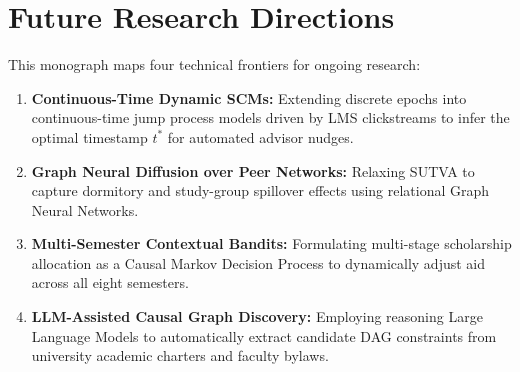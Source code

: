 \section{Future Research Directions}
\label{sec:concl_future}

This monograph maps four technical frontiers for ongoing research:
\begin{enumerate}
    \item \textbf{Continuous-Time Dynamic SCMs:} Extending discrete epochs into continuous-time jump process models driven by LMS clickstreams to infer the optimal timestamp $t^*$ for automated advisor nudges.
    \item \textbf{Graph Neural Diffusion over Peer Networks:} Relaxing SUTVA to capture dormitory and study-group spillover effects using relational Graph Neural Networks.
    \item \textbf{Multi-Semester Contextual Bandits:} Formulating multi-stage scholarship allocation as a Causal Markov Decision Process to dynamically adjust aid across all eight semesters.
    \item \textbf{LLM-Assisted Causal Graph Discovery:} Employing reasoning Large Language Models to automatically extract candidate DAG constraints from university academic charters and faculty bylaws.
\end{enumerate}
